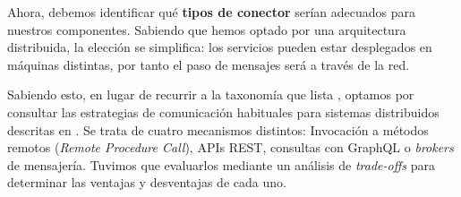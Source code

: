 Ahora, debemos identificar qué \textbf{tipos de conector} serían adecuados para nuestros componentes. Sabiendo que hemos optado por una arquitectura distribuida, la elección se simplifica: los servicios pueden estar desplegados en máquinas distintas, por tanto el paso de mensajes será a través de la red.

Sabiendo esto, en lugar de recurrir a la taxonomía que lista \cite{mehtaTaxonomySoftwareConnectors2000}, optamos por consultar las estrategias de comunicación habituales para sistemas distribuidos descritas en \cite{newmanBuildingMicroservicesDesigning2021}. Se trata de cuatro mecanismos distintos: Invocación a métodos remotos (\textit{Remote Procedure Call}), APIs REST, consultas con GraphQL o \textit{brokers} de mensajería. Tuvimos que evaluarlos mediante un análisis de \textit{trade-offs} para determinar las ventajas y desventajas de cada uno.

